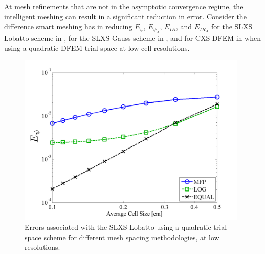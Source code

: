 At mesh refinements that are not in the asymptotic convergence regime, the intelligent meshing can result in a significant reduction in error.  
Consider the difference smart meshing has in reducing $E_{\psi}$, $E_{\psi_A}$, $E_{IR}$, and $E_{IR_A}$ for the SLXS Lobatto scheme in
, for the SLXS Gauss scheme in , 
and for CXS DFEM in  when using a quadratic DFEM trial space at low cell resolutions.
\begin{figure}[!hbp]
\centering
\includegraphics[width=11cm]{chapter3_variable_xs/LOW_RES_P2_LOBATTO_E_PSI.png}
\caption{Errors associated with the SLXS Lobatto using a quadratic trial space scheme for different mesh spacing methodologies, at low resolutions.}
\label{fig:low_res_lobatto_psi}
\end{figure}
\vfill{}
\pagebreak


